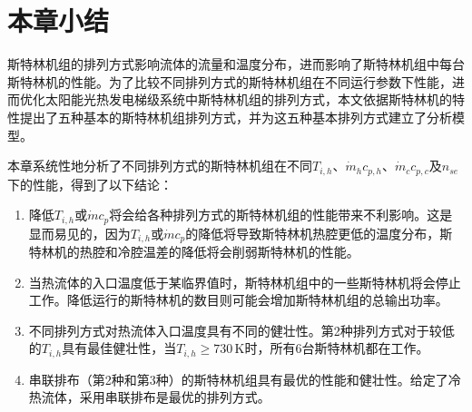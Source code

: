 \section{本章小结}

斯特林机组的排列方式影响流体的流量和温度分布，进而影响了斯特林机组中每台斯特林机的性能。为了比较不同排列方式的斯特林机组在不同运行参数下性能，进而优化太阳能光热发电梯级系统中斯特林机组的排列方式，本文依据斯特林机的特性提出了五种基本的斯特林机组排列方式，并为这五种基本排列方式建立了分析模型。

本章系统性地分析了不同排列方式的斯特林机组在不同$T_{i,h}$、$\dot{m}_hc_{p,h}$、$\dot{m}_cc_{p,c}$及$n_{se}$下的性能，得到了以下结论：

\begin{enumerate}[label=(\arabic*)]
	\item 降低$T_{i,h}$或$\dot{m}c_{p}$将会给各种排列方式的斯特林机组的性能带来不利影响。这是显而易见的，因为$T_{i,h}$或$\dot{m}c_p$的降低将导致斯特林机热腔更低的温度分布，斯特林机的热腔和冷腔温差的降低将会削弱斯特林机的性能。
	\item 当热流体的入口温度低于某临界值时，斯特林机组中的一些斯特林机将会停止工作。降低运行的斯特林机的数目则可能会增加斯特林机组的总输出功率。
	\item 不同排列方式对热流体入口温度具有不同的健壮性。第2种排列方式对于较低的$T_{i,h}$具有最佳健壮性，当$T_{i,h} \geqslant 730\,\mathrm{K}$时，所有6台斯特林机都在工作。
	\item 串联排布（第2种和第3种）的斯特林机组具有最优的性能和健壮性。给定了冷热流体，采用串联排布是最优的排列方式。
\end{enumerate}